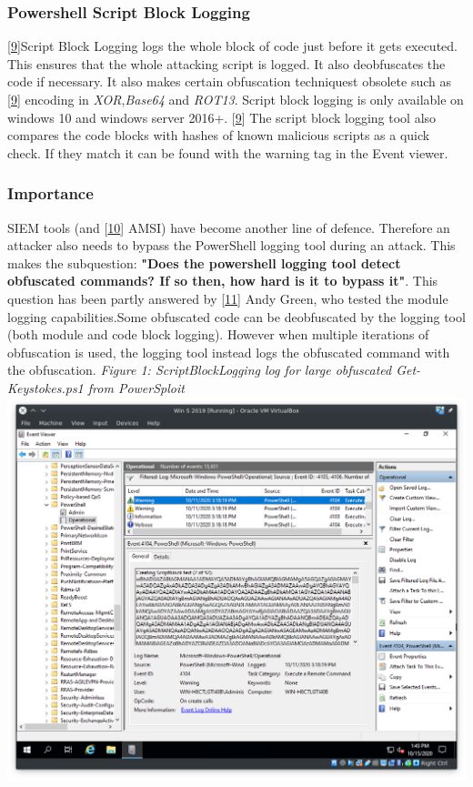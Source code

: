 \documentclass{article}%
\begin{document}
\subsubsection{Powershell Script Block Logging}
[\hyperlink{9}{9}]Script Block Logging logs the whole block of code just before it gets executed. This ensures that the whole attacking script is logged. It also deobfuscates the code if necessary. It also makes certain obfuscation techniquest obsolete such as [\hyperlink{9}{9}] encoding in \textit{XOR},\textit{Base64} and \textit{ROT13}. Script block logging is only available on windows 10 and windows server 2016+. [\hyperlink{9}{9}] The script block logging tool also compares the code blocks with hashes of known malicious scripts as a quick check. If they match it can be found with the warning tag in the Event viewer.
\subsubsection{Importance}
SIEM tools (and [\hyperlink{10}{10}] AMSI) have become another line of defence. Therefore an attacker also needs to bypass the PowerShell logging tool during an attack. This makes the subquestion: \textbf{"Does the powershell logging tool detect obfuscated commands? If so then, how hard is it to bypass it"}. This question has been partly answered by [\hyperlink{11}{11}] Andy Green, who tested the module logging capabilities.Some obfuscated code can be deobfuscated by the logging tool (both module and code block logging). However when multiple iterations of obfuscation is used, the logging tool instead logs the obfuscated command with the obfuscation.
\newline\newline
\hypertarget{fig1}{
	\textit{Figure 1: ScriptBlockLogging log for large obfuscated Get-Keystokes.ps1 from PowerSploit}\\
	\includegraphics[scale=0.44]{1.png}
}
\end{document}
